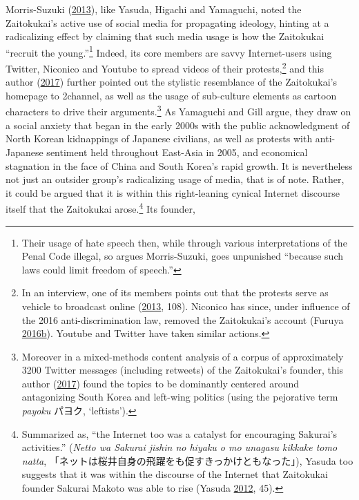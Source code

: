 \documentclass[10pt,british,A4paper,,openany]{memoir}
\begin{document}
Morris-Suzuki
(\protect\hyperlink{ref-morris-suzuki_freedom_2013}{2013}), like Yasuda,
Higachi and Yamaguchi, noted the Zaitokukai's active use of social media
for propagating ideology, hinting at a radicalizing effect by claiming
that such media usage is how the Zaitokukai ``recruit the
young.''\footnote{Their usage of hate speech then, while through various
  interpretations of the Penal Code illegal, so argues Morris-Suzuki,
  goes unpunished ``because such laws could limit freedom of speech.''}
Indeed, its core members are savvy Internet-users using Twitter,
Niconico and Youtube to spread videos of their protests,\footnote{In an
  interview, one of its members points out that the protests serve as
  vehicle to broadcast online
  (\protect\hyperlink{ref-yamaguchi_xenophobia_2013}{2013}, 108).
  Niconico has since, under influence of the 2016 anti-discrimination
  law, removed the Zaitokukai's account (Furuya
  \protect\hyperlink{ref-furuya_can_2016}{2016}\protect\hyperlink{ref-furuya_can_2016}{b}).
  Youtube and Twitter have taken similar actions.} and this author
(\protect\hyperlink{ref-poppe_digitaal_2017}{2017}) further pointed out
the stylistic resemblance of the Zaitokukai's homepage to 2channel, as
well as the usage of sub-culture elements as cartoon characters to drive
their arguments.\footnote{Moreover in a mixed-methods content analysis
  of a corpus of approximately 3200 Twitter messages (including
  retweets) of the Zaitokukai's founder, this author
  (\protect\hyperlink{ref-poppe_digitaal_2017}{2017}) found the topics
  to be dominantly centered around antagonizing South Korea and
  left-wing politics (using the pejorative term \emph{payoku} パヨク,
  `leftists').} As Yamaguchi and Gill argue, they draw on a social
anxiety that began in the early 2000s with the public acknowledgment of
North Korean kidnappings of Japanese civilians, as well as protests with
anti-Japanese sentiment held throughout East-Asia in 2005, and
economical stagnation in the face of China and South Korea's rapid
growth. It is nevertheless not just an outsider group's radicalizing
usage of media, that is of note. Rather, it could be argued that it is
within this right-leaning cynical Internet discourse itself that the
Zaitokukai arose.\footnote{Summarized as, ``the Internet too was a
  catalyst for encouraging Sakurai's activities.'' (\emph{Netto wa
  Sakurai jishin no hiyaku o mo unagasu kikkake tomo natta},
  「ネットは桜井自身の飛躍をも促すきっかけともなった」), Yasuda too
  suggests that it was within the discourse of the Internet that
  Zaitokukai founder Sakurai Makoto was able to rise (Yasuda
  \protect\hyperlink{ref-yasuda_eng:_2012}{2012}, 45).} Its founder,
\end{document}
